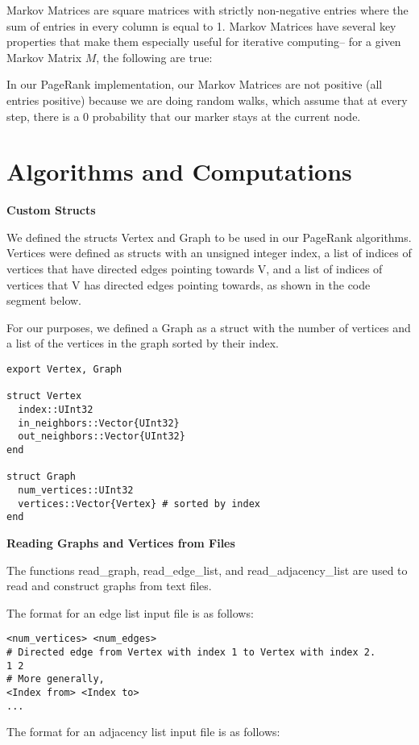 \documentclass[12pt, titlepage, twoside]{amsart}
\theoremstyle{remark}
\begin{document}
Markov Matrices are square matrices with strictly non-negative entries where the sum of entries in every column is equal to 1. Markov Matrices have several key properties that make them especially useful for iterative computing-- for a given Markov Matrix $M$, the following are true:


In our PageRank implementation, our Markov Matrices are not positive (all entries positive) because we are doing random walks, which assume that at every step, there is a 0 probability that our marker stays at the current node.

\section{Algorithms and Computations}

\textbf{Custom Structs}

We defined the structs Vertex and Graph to be used in our PageRank algorithms. Vertices were defined as structs with an unsigned integer index, a list of indices of vertices that have directed edges pointing towards V, and a list of indices of vertices that V has directed edges pointing towards, as shown in the code segment below. 

For our purposes, we defined a Graph as a struct with the number of vertices and a list of the vertices in the graph sorted by their index.

\begin{verbatim}
export Vertex, Graph

struct Vertex
  index::UInt32
  in_neighbors::Vector{UInt32}
  out_neighbors::Vector{UInt32}
end

struct Graph
  num_vertices::UInt32
  vertices::Vector{Vertex} # sorted by index
end
\end{verbatim}

\textbf{Reading Graphs and Vertices from Files}

The functions read\_graph, read\_edge\_list, and read\_adjacency\_list are used to read and construct graphs from text files.

The format for an edge list input file is as follows:

\begin{lstlisting}[basicstyle=\small]
<num_vertices> <num_edges>
# Directed edge from Vertex with index 1 to Vertex with index 2.
1 2
# More generally,
<Index from> <Index to>
...
\end{lstlisting}

The format for an adjacency list input file is as follows:
\end{document}
